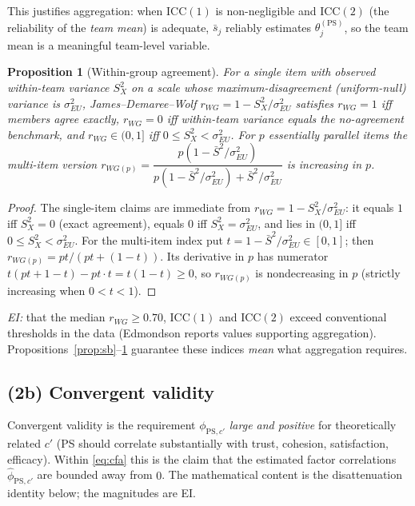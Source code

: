 \documentclass{amsart}
\newtheorem{proposition}{Proposition}
\theoremstyle{remark}
\begin{document}
This justifies aggregation: when $\mathrm{ICC}(1)$ is non-negligible and
$\mathrm{ICC}(2)$ (the reliability of the \emph{team mean}) is adequate, $\bar s_j$
reliably estimates $\theta^{(\mathrm{PS})}_j$, so the team mean is a meaningful
team-level variable.

\begin{proposition}[Within-group agreement]\label{prop:rwg}
For a single item with observed within-team variance $S_X^2$ on a scale whose
maximum-disagreement (uniform-null) variance is $\sigma^2_{EU}$, James--Demaree--Wolf
$r_{WG}=1-S_X^2/\sigma^2_{EU}$ satisfies $r_{WG}=1$ iff members agree exactly,
$r_{WG}=0$ iff within-team variance equals the no-agreement benchmark, and
$r_{WG}\in(0,1]$ iff $0\le S_X^2<\sigma^2_{EU}$. For $p$ essentially parallel items
the multi-item version
$r_{WG(p)}=\dfrac{p(1-\bar S^2/\sigma^2_{EU})}{p(1-\bar S^2/\sigma^2_{EU})+\bar S^2/\sigma^2_{EU}}$
is increasing in $p$.
\end{proposition}
\begin{proof}
The single-item claims are immediate from $r_{WG}=1-S_X^2/\sigma^2_{EU}$: it equals
$1$ iff $S_X^2=0$ (exact agreement), equals $0$ iff $S_X^2=\sigma^2_{EU}$, and lies
in $(0,1]$ iff $0\le S_X^2<\sigma^2_{EU}$. For the multi-item index put
$t=1-\bar S^2/\sigma^2_{EU}\in[0,1]$; then $r_{WG(p)}=pt/(pt+(1-t))$. Its derivative
in $p$ has numerator $t(pt+1-t)-pt\cdot t=t(1-t)\ge0$, so $r_{WG(p)}$ is
nondecreasing in $p$ (strictly increasing when $0<t<1$). \end{proof}
\emph{EI:} that the median $r_{WG}\ge 0.70$, $\mathrm{ICC}(1)$ and $\mathrm{ICC}(2)$
exceed conventional thresholds in the data (Edmondson reports values supporting
aggregation). Propositions~\ref{prop:sb}--\ref{prop:rwg} guarantee these indices
\emph{mean} what aggregation requires.

\subsection{(2b) Convergent validity}
Convergent validity is the requirement $\phi_{\mathrm{PS},c'}$ \emph{large and
positive} for theoretically related $c'$ (PS should correlate substantially with
trust, cohesion, satisfaction, efficacy). Within \eqref{eq:cfa} this is the claim
that the estimated factor correlations $\hat\phi_{\mathrm{PS},c'}$ are bounded away
from $0$. The mathematical content is the disattenuation identity below; the
magnitudes are EI.
\end{document}
